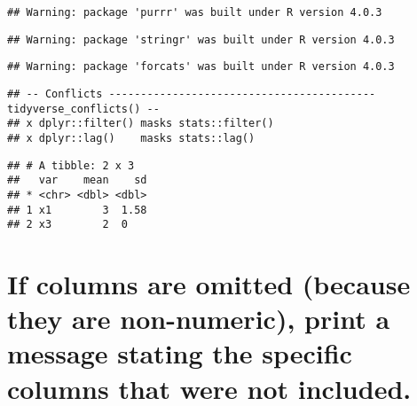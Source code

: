 \documentclass[
]{article}
\newenvironment{Shaded}{\begin{snugshade}}{\end{snugshade}}
\newcommand{\ControlFlowTok}[1]{\textcolor[rgb]{0.13,0.29,0.53}{\textbf{#1}}}
\newcommand{\DataTypeTok}[1]{\textcolor[rgb]{0.13,0.29,0.53}{#1}}
\newcommand{\KeywordTok}[1]{\textcolor[rgb]{0.13,0.29,0.53}{\textbf{#1}}}
\newcommand{\NormalTok}[1]{#1}
\newcommand{\OperatorTok}[1]{\textcolor[rgb]{0.81,0.36,0.00}{\textbf{#1}}}
\newcommand{\OtherTok}[1]{\textcolor[rgb]{0.56,0.35,0.01}{#1}}
\newcommand{\StringTok}[1]{\textcolor[rgb]{0.31,0.60,0.02}{#1}}
\begin{document}
\begin{verbatim}
## Warning: package 'purrr' was built under R version 4.0.3
\end{verbatim}

\begin{verbatim}
## Warning: package 'stringr' was built under R version 4.0.3
\end{verbatim}

\begin{verbatim}
## Warning: package 'forcats' was built under R version 4.0.3
\end{verbatim}

\begin{verbatim}
## -- Conflicts ------------------------------------------ tidyverse_conflicts() --
## x dplyr::filter() masks stats::filter()
## x dplyr::lag()    masks stats::lag()
\end{verbatim}

\begin{Shaded}
\end{Shaded}

\begin{verbatim}
## # A tibble: 2 x 3
##   var    mean    sd
## * <chr> <dbl> <dbl>
## 1 x1        3  1.58
## 2 x3        2  0
\end{verbatim}

\hypertarget{if-columns-are-omitted-because-they-are-non-numeric-print-a-message-stating-the-specific-columns-that-were-not-included.}{%
\section{If columns are omitted (because they are non-numeric), print a
message stating the specific columns that were not
included.}\label{if-columns-are-omitted-because-they-are-non-numeric-print-a-message-stating-the-specific-columns-that-were-not-included.}}
\end{document}
